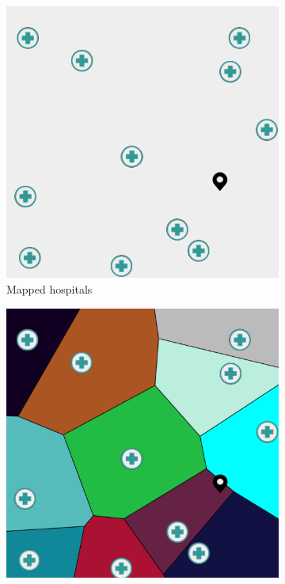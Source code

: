 \begin{center}
    \begin{figure}[H]
        \centering
        \begin{subfigure}[b]{0.45\textwidth}
            \centering
            \includegraphics[width=\textwidth]{resources/images/introduction/HospitalNoVoronoi.png}
            \caption{Mapped hospitals}
            \label{fig:mappedHospitals}
        \end{subfigure}
        \hfill
        \begin{subfigure}[b]{0.45\textwidth}
            \centering
            \includegraphics[width=\textwidth]{resources/images/introduction/HospitalVoronoi.png}

\end{subfigure}
\end{figure}
\end{center}
